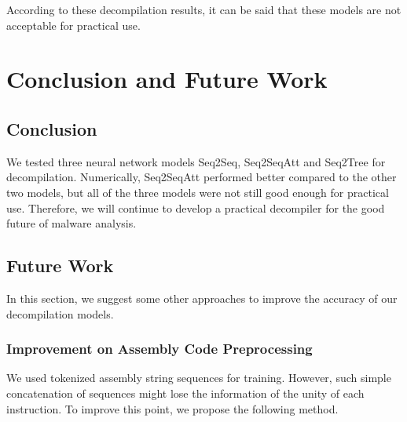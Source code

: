 \documentclass[senior,final,11pt]{iscs-thesis}
\begin{document}
According to these decompilation results, it can be said that these models are not acceptable for practical use.






\chapter{Conclusion and Future Work}
\section{Conclusion}
We tested three neural network models Seq2Seq, Seq2SeqAtt and Seq2Tree for decompilation.
Numerically, Seq2SeqAtt performed better compared to the other two models,
but all of the three models were not still good enough for practical use.
Therefore, we will continue to develop a practical decompiler for the good future of malware analysis.

\section{Future Work}
In this section, we suggest some other approaches to improve the accuracy of our decompilation models.

\subsection{Improvement on Assembly Code Preprocessing}
We used tokenized assembly string sequences for training. 
However, such simple concatenation of sequences might lose the information of the unity of each instruction.
To improve this point, we propose the following method.
\end{document}
